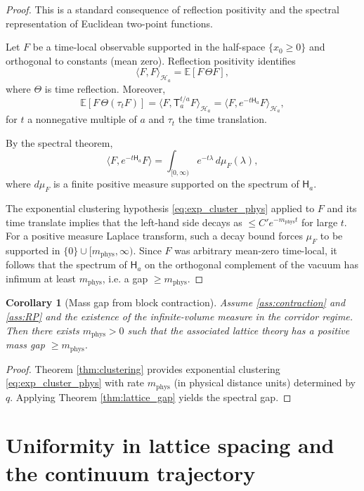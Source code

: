 \documentclass[11pt]{article}
\newtheorem{corollary}[theorem]{Corollary}
\theoremstyle{definition}
\newcommand{\E}{\mathbb{E}}
\newcommand{\1}{\mathbf{1}}
\newcommand{\ip}[2]{\langle #1,#2\rangle}
\begin{document}
\begin{proof}
This is a standard consequence of reflection positivity and the spectral representation of Euclidean two-point functions.

Let $F$ be a time-local observable supported in the half-space $\{x_0\ge 0\}$ and orthogonal to constants (mean zero). Reflection positivity identifies
\[
\ip{F}{F}_{\mathcal{H}_a} = \E[F\,\Theta F],
\]
where $\Theta$ is time reflection. Moreover,
\[
\E[F\,\Theta (\tau_t F)] = \ip{F}{\mathsf{T}_a^{t/a}F}_{\mathcal{H}_a} = \ip{F}{e^{-t\mathsf{H}_a}F}_{\mathcal{H}_a},
\]
for $t$ a nonnegative multiple of $a$ and $\tau_t$ the time translation.

By the spectral theorem,
\[
\ip{F}{e^{-t\mathsf{H}_a}F} = \int_{[0,\infty)} e^{-t\lambda}\,d\mu_F(\lambda),
\]
where $d\mu_F$ is a finite positive measure supported on the spectrum of $\mathsf{H}_a$.

The exponential clustering hypothesis \eqref{eq:exp_cluster_phys} applied to $F$ and its time translate implies that the left-hand side decays as $\le C' e^{-m_{\mathrm{phys}} t}$ for large $t$. For a positive measure Laplace transform, such a decay bound forces $\mu_F$ to be supported in $\{0\}\cup [m_{\mathrm{phys}},\infty)$. Since $F$ was arbitrary mean-zero time-local, it follows that the spectrum of $\mathsf{H}_a$ on the orthogonal complement of the vacuum has infimum at least $m_{\mathrm{phys}}$, i.e. a gap $\ge m_{\mathrm{phys}}$.
\end{proof}

\begin{corollary}[Mass gap from block contraction]\label{cor:gap_from_contraction}
Assume \ref{ass:contraction} and \ref{ass:RP} and the existence of the infinite-volume measure in the corridor regime. Then there exists $m_{\mathrm{phys}}>0$ such that the associated lattice theory has a positive mass gap $\ge m_{\mathrm{phys}}$.
\end{corollary}

\begin{proof}
Theorem \ref{thm:clustering} provides exponential clustering \eqref{eq:exp_cluster_phys} with rate $m_{\mathrm{phys}}$ (in physical distance units) determined by $q$. Applying Theorem \ref{thm:lattice_gap} yields the spectral gap.
\end{proof}

\section{Uniformity in lattice spacing and the continuum trajectory}
\end{document}
